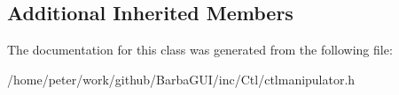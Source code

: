 \subsection*{Additional Inherited Members}


The documentation for this class was generated from the following file\+:\begin{DoxyCompactItemize}
\item 
/home/peter/work/github/\+Barba\+G\+U\+I/inc/\+Ctl/ctlmanipulator.\+h\end{DoxyCompactItemize}
